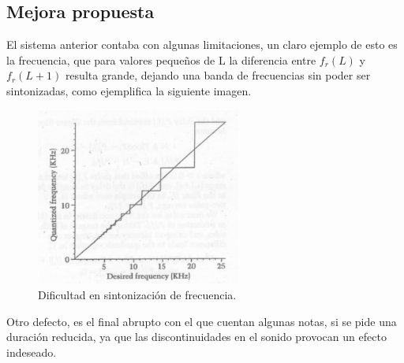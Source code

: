 \subsection{Mejora propuesta}
El sistema anterior contaba con algunas limitaciones, un claro ejemplo de esto es la frecuencia,
que para valores pequeños de L la diferencia entre $f_r(L)$ y $f_r(L+1)$ resulta grande, dejando una banda de frecuencias sin poder ser sintonizadas, como ejemplifica la siguiente imagen.
\begin{figure}[H]
	\centering
	\includegraphics[width=0.6\textwidth]{ImagenesEjercicio4/sintfreq.PNG}
\caption{Dificultad en sintonización de frecuencia.}
	\label{fig:sintfreq}
\end{figure}
Otro defecto, es el final abrupto con el que cuentan algunas notas, si se pide una duración reducida, ya que las discontinuidades en el sonido provocan un efecto indeseado.
